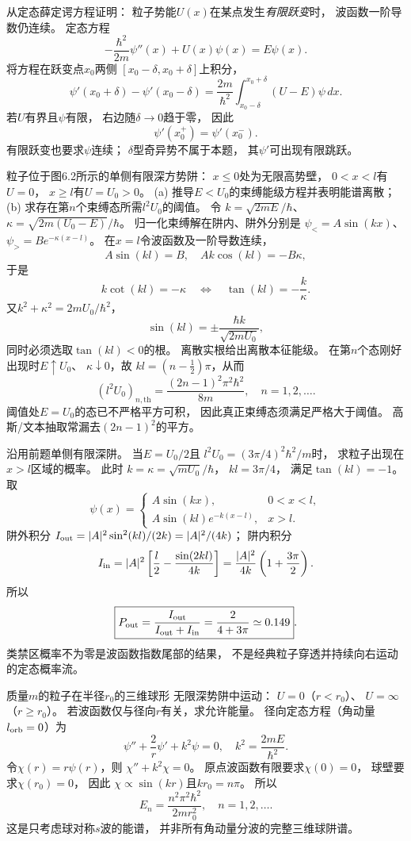 从定态薛定谔方程证明：
粒子势能$U(x)$在某点发生\emph{有限跃变}时，
波函数一阶导数仍连续。
\exsolution
定态方程
\[
 -\frac{\hbar^2}{2m}\psi''(x)+U(x)\psi(x)=E\psi(x).
\]
将方程在跃变点$x_0$两侧
$[x_0-\delta,x_0+\delta]$上积分，
\[
 \psi'(x_0+\delta)-\psi'(x_0-\delta)
 =\frac{2m}{\hbar^2}
 \int_{x_0-\delta}^{x_0+\delta}(U-E)\psi\,dx.
\]
若$U$有界且$\psi$有限，
右边随$\delta\to0$趋于零，
因此
\[
 \boxed{\psi'(x_0^+)=\psi'(x_0^-)}.
\]
\excheck 有限跃变也要求$\psi$连续；
$\delta$型奇异势不属于本题，
其$\psi'$可出现有限跳跃。

粒子位于图6.2所示的单侧有限深方势阱：
$x\le0$处为无限高势壁，
$0<x<l$有$U=0$，
$x\ge l$有$U=U_0>0$。
(a) 推导$E<U_0$的束缚能级方程并表明能谱离散；
(b) 求存在第$n$个束缚态所需$l^2U_0$的阈值。
\exsolution
令
$k=\sqrt{2mE}/\hbar$、
$\kappa=\sqrt{2m(U_0-E)}/\hbar$。
归一化束缚解在阱内、阱外分别是
$\psi_<=A\sin(kx)$、
$\psi_>=B e^{-\kappa(x-l)}$。
在$x=l$令波函数及一阶导数连续，
\[
 A\sin(kl)=B,\quad
 Ak\cos(kl)=-B\kappa,
\]
于是
\[
 \boxed{k\cot(kl)=-\kappa
 \quad\Longleftrightarrow\quad \tan(kl)=-\frac k\kappa}.
\]
又$k^2+\kappa^2=2mU_0/\hbar^2$，
\[
 \boxed{\sin(kl)=\pm\frac{\hbar k}{\sqrt{2mU_0}}},
\]
同时必须选取$\tan(kl)<0$的根。
离散实根给出离散本征能级。
在第$n$个态刚好出现时$E\uparrow U_0$、
$\kappa\downarrow0$，故
$kl=(n-\tfrac12)\pi$，从而
\[
 \boxed{(l^2U_0)_{n,\mathrm{th}}=
 \frac{(2n-1)^2\pi^2\hbar^2}{8m}},
 \quad n=1,2,\dots.
\]
\excheck 阈值处$E=U_0$的态已不严格平方可积，
因此真正束缚态须满足严格大于阈值。
高斯/文本抽取常漏去$(2n-1)^2$的平方。

沿用前题单侧有限深阱。
当$E=U_0/2$且
$l^2U_0=(3\pi/4)^2\hbar^2/m$时，
求粒子出现在$x>l$区域的概率。
\exsolution
此时
$k=\kappa=\sqrt{mU_0}/\hbar$，
$kl=3\pi/4$，
满足$\tan(kl)=-1$。
取
\[
 \psi(x)=
 \begin{cases}
 A\sin(kx),&0<x<l,\\
 A\sin(kl)e^{-k(x-l)},&x>l.
 \end{cases}
\]
阱外积分
$I_{\rm out}=|A|^2\sin^2(kl)/(2k)=|A|^2/(4k)$；
阱内积分
\[
 I_{\rm in}=|A|^2
 \left[\frac l2-\frac{\sin(2kl)}{4k}\right]
 =\frac{|A|^2}{4k}\left(1+\frac{3\pi}{2}\right).
\]
所以
\[
 \boxed{P_{\rm out}=
 \frac{I_{\rm out}}{I_{\rm out}+I_{\rm in}}
 =\frac2{4+3\pi}\simeq0.149}.
\]
\excheck 类禁区概率不为零是波函数指数尾部的结果，
不是经典粒子穿透并持续向右运动的定态概率流。

质量$m$的粒子在半径$r_0$的三维球形
无限深势阱中运动：
$U=0$（$r<r_0$）、
$U=\infty$（$r\ge r_0$）。
若波函数仅与径向$r$有关，求允许能量。
\exsolution
径向定态方程（角动量$l_{\rm orb}=0$）为
\[
 \psi''+\frac2r\psi'+k^2\psi=0,\quad
 k^2=\frac{2mE}{\hbar^2}.
\]
令$\chi(r)=r\psi(r)$，则
$\chi''+k^2\chi=0$。
原点波函数有限要求$\chi(0)=0$，
球壁要求$\chi(r_0)=0$，
因此
$\chi\propto\sin(kr)$且$kr_0=n\pi$。
所以
\[
 \boxed{E_n=\frac{n^2\pi^2\hbar^2}{2mr_0^2}},
 \quad n=1,2,\dots.
\]
\excheck 这是只考虑球对称$s$波的能谱，
并非所有角动量分波的完整三维球阱谱。


